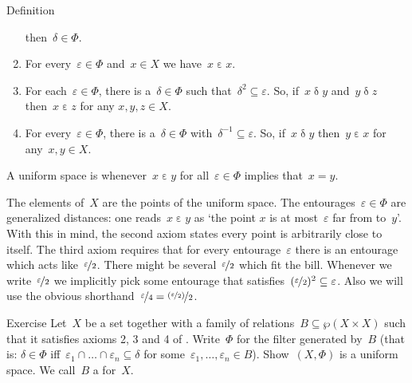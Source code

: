 \documentclass[b]{subfiles}
\begin{document}
\begin{parsec}
\begin{point}{Definition}
\begin{enumerate}
\begin{inparaenum}
            then~$\delta \in \Phi$.
        \end{inparaenum}
    \item
        For every~$\varepsilon \in \Phi$
            and~$x \in X$ we have~$x \mathrel\varepsilon x$.
    \item
        For each~$\varepsilon \in \Phi$,
            there is a~$\delta \in \Phi$
            such that~$\delta^2 \subseteq \varepsilon$.
        So, if~$x \mathrel\delta y$ and~$y \mathrel\delta z$
            then~$x \mathrel\varepsilon z$ for any $x,y,z \in X$.
    \item
        For every~$\varepsilon \in \Phi$,
            there is a~$\delta \in \Phi$
                with~$\delta^{-1}\subseteq \varepsilon$.
        So, if~$x \mathrel\delta y$ then~$y \mathrel\varepsilon x$
            for any~$x,y \in X$.
    \end{enumerate}
    A uniform space is 
        whenever~$x \mathrel\varepsilon y$
            for all~$\varepsilon \in \Phi$
            implies that~$x=y$.
\begin{point}%
The elements of~$X$ are the points of the uniform space.
The entourages~$\varepsilon \in \Phi$
    are generalized distances:
one reads~$x \mathrel\varepsilon y$ as
    `the point $x$ is at most~$\varepsilon$ far from to~$y$'.
With this in mind, the second axiom states every point is arbitrarily close
    to itself.
The third axiom requires that for every entourage~$\varepsilon$
    there is an entourage which acts like~$\nicefrac{\varepsilon}{2}$.
There might be several~$\nicefrac{\varepsilon}{2}$
    which fit the bill.
Whenever we write~$\nicefrac{\varepsilon}{2}$
    we implicitly pick some entourage that
    satisfies~$(\nicefrac{\varepsilon}{2})^2 \subseteq \varepsilon$.
Also we will use the obvious shorthand~$\nicefrac{\varepsilon}{4}
=   \nicefrac{(\nicefrac{\varepsilon}{2})}{2}$.
\end{point}
\end{point}
\begin{point}{Exercise}%
Let~$X$ be a set together with
    a family of relations~$B \subseteq \wp (X \times X)$
    such that it satisfies axioms 2, 3 and 4
    of .
Write~$\Phi$ for the filter generated by~$B$
    (that is: $\delta \in \Phi$
        iff~$\varepsilon_1 \cap \ldots \cap \varepsilon_n \subseteq \delta$
            for some~$\varepsilon_1, \ldots, \varepsilon_n \in B$).
Show~$(X,\Phi)$ is a uniform space.
We call~$B$ a  for~$X$.

\end{point}
\end{parsec}
\end{document}
